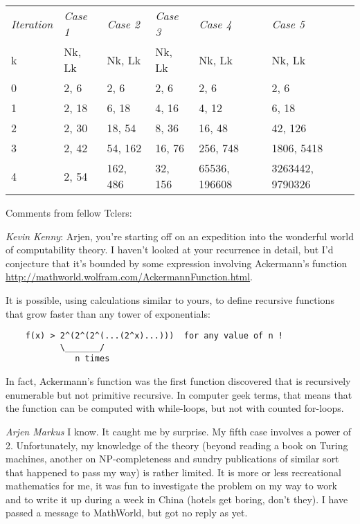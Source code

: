 \documentclass[onecolumn]{article}
\begin{document}
\begin{tabular}{llllll}
\hline
\emph{Iteration}  & \emph{Case 1}   & \emph{Case 2}    & \emph{Case 3}  & \emph{Case 4}          & \emph{Case 5}    \\
      k           & Nk, Lk          & Nk, Lk           & Nk, Lk         & Nk, Lk                 & Nk, Lk           \\
\hline
      0           & 2, 6            & 2, 6             & 2, 6           & 2, 6                   & 2, 6             \\
      1           & 2, 18           & 6, 18            & 4, 16          & 4, 12                  & 6, 18            \\
      2           & 2, 30           & 18, 54           & 8, 36          & 16, 48                 & 42, 126          \\
      3           & 2, 42           & 54, 162          & 16, 76         & 256, 748               & 1806, 5418       \\
      4           & 2, 54           & 162, 486         & 32, 156        & 65536, 196608          & 3263442, 9790326 \\
\hline
\end{tabular}

\vspace{\baselineskip}
Comments from fellow Tclers:

\emph{Kevin Kenny}: Arjen, you're starting off on an expedition into the wonderful world of computability theory.
I haven't looked at your recurrence in detail, but I'd conjecture that it's bounded by some expression involving
Ackermann's function \url{http://mathworld.wolfram.com/AckermannFunction.html}.

It is possible, using calculations similar to yours, to define recursive functions that grow faster than any tower of exponentials:

\begin{verbatim}
    f(x) > 2^(2^(2^(...(2^x)...)))  for any value of n !
           \_______/
              n times
\end{verbatim}

In fact, Ackermann's function was the first function discovered that is recursively enumerable but not primitive recursive.
In computer geek terms, that means that the function can be computed with while-loops, but not with counted for-loops.

\emph{Arjen Markus} I know. It caught me by surprise. My fifth case involves a power of 2. Unfortunately, my knowledge of the
theory (beyond reading a book on Turing machines, another on NP-completeness and sundry publications of similar sort that
happened to pass my way) is rather limited. It is more or less recreational mathematics for me, it was fun to investigate
the problem on my way to work and to write it up during a week in China (hotels get boring, don't they). I have passed a
message to MathWorld, but got no reply as yet.
\end{document}
